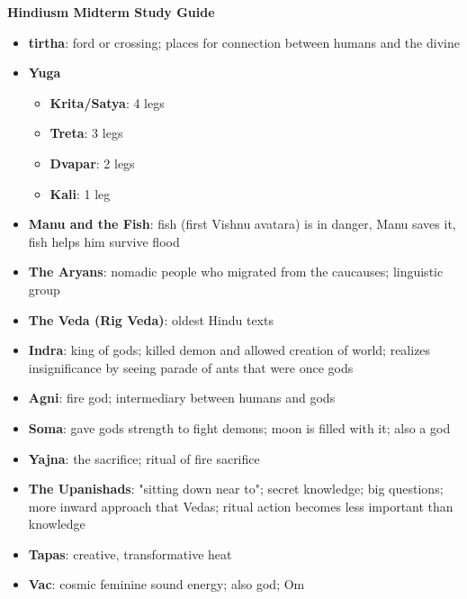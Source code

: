 \documentclass[11pt]{article} %
\begin{document}
\begin{center}
{\bf Hindiusm Midterm Study Guide}
\end{center}

\begin{itemize}

\item
{\bf tirtha}: ford or crossing; places for connection between humans and the divine

\item
{\bf Yuga}
\begin{itemize}
\item {\bf Krita/Satya}: 4 legs
\item {\bf Treta}: 3 legs
\item {\bf Dvapar}: 2 legs
\item {\bf Kali}: 1 leg
\end{itemize}

\item
{\bf Manu and the Fish}: fish (first Vishnu avatara) is in danger, Manu saves it, fish helps him survive flood

\item
{\bf The Aryans}: nomadic people who migrated from the caucauses; linguistic group

\item
{\bf The Veda (Rig Veda)}: oldest Hindu texts

\item
{\bf Indra}: king of gods; killed demon and allowed creation of world; realizes insignificance by seeing parade of ants that were once gods

\item
{\bf Agni}: fire god; intermediary between humans and gods

\item
{\bf Soma}: gave gods strength to fight demons; moon is filled with it; also a god

\item
{\bf Yajna}: the sacrifice; ritual of fire sacrifice

\item
{\bf The Upanishads}: "sitting down near to"; secret knowledge; big questions; more inward approach that Vedas; ritual action becomes less important than knowledge

\item
{\bf Tapas}: creative, transformative heat

\item
{\bf Vac}: cosmic feminine sound energy; also god; Om


\end{itemize}
\end{document}
